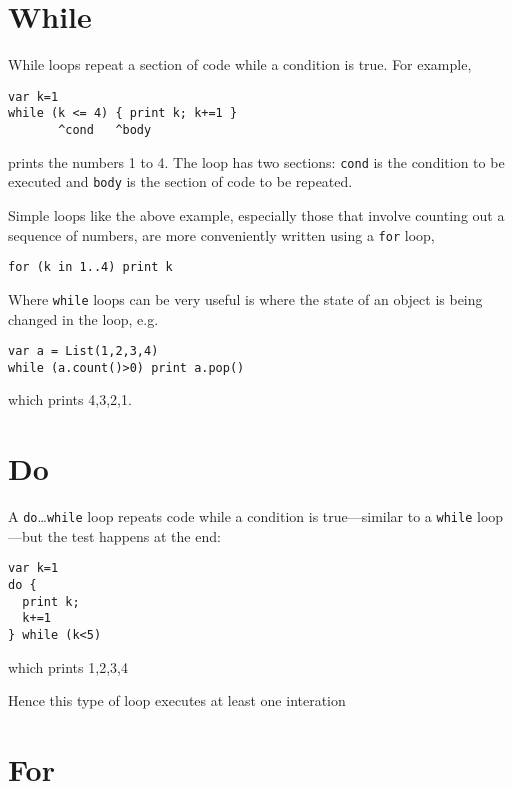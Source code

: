 \hypertarget{while}{%
\section{While}\label{while}}

While loops repeat a section of code while a condition is true. For
example,

\begin{lstlisting}
var k=1
while (k <= 4) { print k; k+=1 }
       ^cond   ^body
\end{lstlisting}

prints the numbers 1 to 4. The loop has two sections: \texttt{cond} is
the condition to be executed and \texttt{body} is the section of code to
be repeated.

Simple loops like the above example, especially those that involve
counting out a sequence of numbers, are more conveniently written using
a \texttt{for} loop,

\begin{lstlisting}
for (k in 1..4) print k
\end{lstlisting}

Where \texttt{while} loops can be very useful is where the state of an
object is being changed in the loop, e.g.

\begin{lstlisting}
var a = List(1,2,3,4)
while (a.count()>0) print a.pop()
\end{lstlisting}

which prints 4,3,2,1.

\hypertarget{do}{%
\section{Do}\label{do}}

A \texttt{do}\ldots{}\texttt{while} loop repeats code while a condition
is true---similar to a \texttt{while} loop---but the test happens at the
end:

\begin{lstlisting}
var k=1
do {
  print k;
  k+=1
} while (k<5)
\end{lstlisting}

which prints 1,2,3,4

Hence this type of loop executes at least one interation

\hypertarget{for}{%
\section{For}\label{for}}

